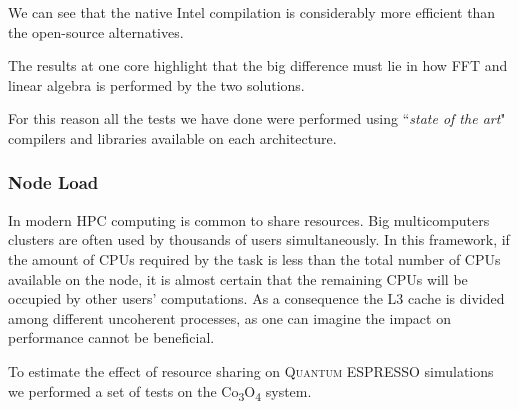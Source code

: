 \documentclass[a4paper,12pt]{article}
\newcommand\QE{\textsc{Quantum} ESPRESSO }
\newcommand\CO{Co\textsubscript{3}O\textsubscript{4} }
\begin{document}


We can see that the native Intel compilation is considerably more efficient than the open-source alternatives.

The results at one core highlight that the big difference must lie in how FFT and linear algebra is performed by the two solutions. 


\begin{framed}
For this reason all the tests we have done were performed using ``\textit{state of the art}" compilers and libraries available on each architecture.
\end{framed}


\subsubsection{Node Load}

In modern HPC computing is common to share resources. Big multicomputers clusters are often used by thousands of users simultaneously.
In this framework, if the amount of CPUs required by the task is less than the total number of CPUs available on the node, it is almost certain that the remaining CPUs will be occupied by other users' computations.
As a consequence the L3 cache is divided among different uncoherent processes, as one can imagine the impact on performance cannot be beneficial.

To estimate the effect of resource sharing on \QE simulations we performed a set of tests on the \CO  system. 
\end{document}
